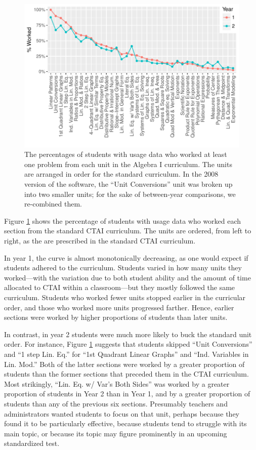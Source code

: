 \documentclass[12pt]{article}\usepackage[]{graphicx}\usepackage[]{color}
\makeatletter
\def\maxwidth{ %
  \ifdim\Gin@nat@width>\linewidth
    \linewidth
  \else
    \Gin@nat@width
  \fi
}
\makeatother
\begin{document}
\begin{figure}
  \centering

\includegraphics[width=\maxwidth]{figure/whichUnits-1} 

\caption{The percentages of students with usage data who worked at
  least one problem from each unit in the Algebra I curriculum. The
  units are arranged in order for the standard curriculum. In the 2008
version of the software, the ``Unit Conversions'' unit was broken up
into two smaller units; for the sake of between-year comparisons, we
re-combined them.}
\label{fig:unitsWorked}
\end{figure}


Figure \ref{fig:unitsWorked} shows the percentage of students with
usage data who worked each section from the standard CTAI curriculum.
The units are ordered, from left to right, as the are prescribed in
the standard CTAI curriculum.

In year 1, the curve is almost monotonically decreasing, as one would
expect if students adhered to the curriculum.
Students varied in how many units they worked---with the variation due
to both student ability and the amount of time allocated to CTAI
within a classroom---but they mostly followed the same curriculum.
Students who worked fewer units stopped earlier in the curricular
order, and those who worked more units progressed farther.
Hence, earlier sections were worked by higher proportions of students
than later units.

In contrast, in year 2 students were much more likely to buck the
standard unit order.
For instance, Figure \ref{fig:unitsWorked} suggests that students
skipped ``Unit Conversions'' and ``1 step Lin. Eq.'' for ``1st
Quadrant Linear Graphs'' and ``Ind. Variables in Lin. Mod.''
Both of the latter sections were worked by a greater proportion of
students than the former sections that preceded them in the CTAI
curriculum.
Most strikingly, ``Lin. Eq. w/ Var's Both Sides'' was worked by a
greater proportion of students in Year 2 than in Year 1, and by a
greater proportion of students than any of the previous six sections.
Presumably teachers and administrators wanted students to focus on
that unit, perhaps because they found it to be particularly effective,
because students tend to struggle with its main topic, or because its
topic may figure prominently in an upcoming standardized test.
\end{document}
